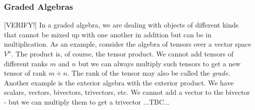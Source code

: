 


\subsubsection{Graded Algebras} [VERIFY!]
In a graded algebra, we are dealing with objects of different kinds that cannot be mixed up with one another in addition but can be in multiplication. As an example, consider the algebra of tensors over a vector space $V^n$. The product is, of course, the tensor product. We cannot add tensors of different ranks $m$ and $n$ but we can always multiply such tensors to get a new tensor of rank $m+n$. The rank of the tensor may also be called the \emph{grade}. Another example is the exterior algebra with the exterior product. We have scalars, vectors, bivectors, trivectors, etc. We cannot add a vector to the bivector - but we can multiply them to get a trivector ...TBC...








